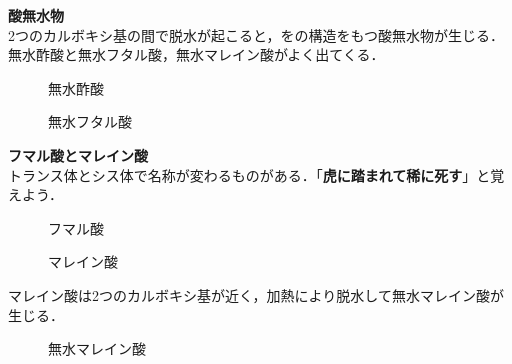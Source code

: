 \documentclass[a4paper,12pt]{ltjsreport}
\begin{document}
\noindent \textbf{酸無水物}\\
2つのカルボキシ基の間で脱水が起こると，をの構造をもつ{\color{red}酸無水物}が生じる．無水酢酸と無水フタル酸，無水マレイン酸がよく出てくる．\\
\begin{minipage}{0.5\linewidth}
\begin{figure}[H]
\centering
{}
\caption{無水酢酸}
\end{figure}
\end{minipage}
\begin{minipage}{0.5\linewidth}
\begin{figure}[H]
\centering
{}
\caption{無水フタル酸}
\end{figure}
\end{minipage}
\noindent \textbf{フマル酸とマレイン酸}\\
トランス体とシス体で名称が変わるものがある．{\color{red}「\textbf{虎に踏まれて稀に死す}」}と覚えよう．
\begin{minipage}{0.5\linewidth}
\begin{figure}[H]
\centering
{}
\caption{フマル酸}
\end{figure}
\end{minipage}
\begin{minipage}{0.5\linewidth}
\begin{figure}[H]
\centering
{}
\caption{マレイン酸}
\end{figure}
\end{minipage}
マレイン酸は2つのカルボキシ基が近く，加熱により脱水して無水マレイン酸が生じる．
\begin{figure}[H]
\centering
{}
\caption{無水マレイン酸}
\end{figure}
\end{document}
